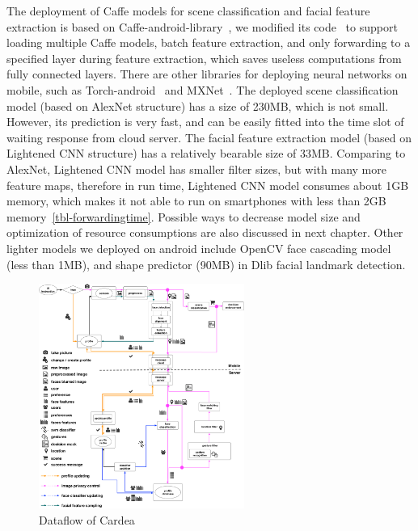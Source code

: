 The deployment of Caffe models for scene classification and facial feature extraction is based on Caffe-android-library~\cite{links:caffeandroidlib}, we modified its code~\cite{links:caffeandroidlibzr} to support loading multiple Caffe models, batch feature extraction, and only forwarding to a specified layer during feature extraction, which saves useless computations from fully connected layers. There are other libraries for deploying neural networks on mobile, such as Torch-android~\cite{links:torchandroid} and MXNet~\cite{links:mxnetmobile}. The deployed scene classification model (based on AlexNet structure) has a size of 230MB, which is not small. However, its prediction is very fast, and can be easily fitted into the time slot of waiting response from cloud server. The facial feature extraction model (based on Lightened CNN structure) has a relatively bearable size of 33MB. Comparing to AlexNet, Lightened CNN model has smaller filter sizes, but with many more feature maps, therefore in run time, Lightened CNN model consumes about 1GB memory, which makes it not able to run on smartphones with less than 2GB memory~\ref{tbl-forwardingtime}. Possible ways to decrease model size and optimization of resource consumptions are also discussed in next chapter. Other lighter models we deployed on android include OpenCV face cascading model (less than 1MB), and shape predictor (90MB) in Dlib facial landmark detection.


\begin{figure}[b!]
    \centering
    \includegraphics[width=0.6\textwidth]{figure/ch4-cardeadataflow.pdf}
    \caption{Dataflow of Cardea}
    \label{fig:ch4-cardeadataflow}
\end{figure}

